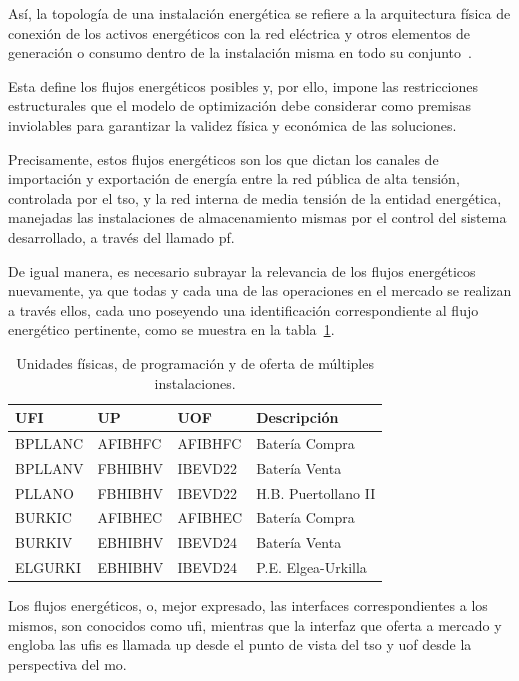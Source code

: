 Así, la topología de una instalación energética se refiere a la arquitectura física de conexión de los activos energéticos con la red eléctrica y otros elementos de generación o consumo dentro de la instalación misma en todo su conjunto~\cite{parlikar2019topology}.

Esta define los flujos energéticos posibles y, por ello, impone las restricciones estructurales que el modelo de optimización debe considerar como premisas inviolables para garantizar la validez física y económica de las soluciones.

Precisamente, estos flujos energéticos son los que dictan los canales de importación y exportación de energía entre la red pública de alta tensión, controlada por el \gls{tso}, y la red interna de media tensión de la entidad energética, manejadas las instalaciones de almacenamiento mismas por el control del sistema desarrollado, a través del llamado \gls{pf}.

De igual manera, es necesario subrayar la relevancia de los flujos energéticos nuevamente, ya que todas y cada una de las operaciones en el mercado se realizan a través ellos, cada uno poseyendo una identificación correspondiente al flujo energético pertinente, como se muestra en la tabla~\ref{tab:unidades-fisicas}.

\begin{table}[ht]
  \centering
  \begin{tabular}{|l|l|l|l|}
    \hline
    UFI     & UP      & UOF     & Descripción         \\
    \hline
    BPLLANC & AFIBHFC & AFIBHFC & Batería Compra      \\
    BPLLANV & FBHIBHV & IBEVD22 & Batería Venta       \\
    PLLANO  & FBHIBHV & IBEVD22 & H.B. Puertollano II \\
    BURKIC  & AFIBHEC & AFIBHEC & Batería Compra      \\
    BURKIV  & EBHIBHV & IBEVD24 & Batería Venta       \\
    ELGURKI & EBHIBHV & IBEVD24 & P.E. Elgea-Urkilla  \\
    \hline
  \end{tabular}
  \caption[Unidades físicas, de programación y de oferta.]{Unidades físicas, de programación y de oferta de múltiples instalaciones.}%
  \label{tab:unidades-fisicas}
\end{table}

Los flujos energéticos, o, mejor expresado, las interfaces correspondientes a los mismos, son conocidos como \gls{ufi}, mientras que la interfaz que oferta a mercado y engloba las \glspl{ufi} es llamada \gls{up} desde el punto de vista del \gls{tso} y \gls{uof} desde la perspectiva del \gls{mo}.

